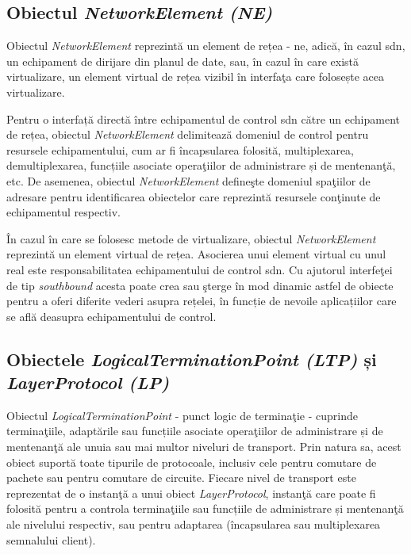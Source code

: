 \subsection{Obiectul \textit{NetworkElement (NE)}}

Obiectul \textit{NetworkElement} reprezintă un element de rețea - \gls{ne}, adică, în cazul \gls{sdn}, un echipament de dirijare din planul de date, sau, în cazul în care există virtualizare, un element virtual de rețea vizibil în interfaţa care folosește acea virtualizare.

Pentru o interfață directă între echipamentul de control \gls{sdn} către un echipament de rețea, obiectul \textit{NetworkElement} delimitează domeniul de control pentru resursele echipamentului, cum ar fi încapsularea folosită, multiplexarea, demultiplexarea, funcțiile asociate operaţiilor de administrare și de mentenanţă, etc. De asemenea, obiectul \textit{NetworkElement} defineşte domeniul spaţiilor de adresare pentru identificarea obiectelor care reprezintă resursele conţinute de echipamentul respectiv.

În cazul în care se folosesc metode de virtualizare, obiectul \textit{NetworkElement} reprezintă un element virtual de rețea. Asocierea unui element virtual cu unul real este responsabilitatea echipamentului de control \gls{sdn}. Cu ajutorul interfeţei de tip \textit{southbound} acesta poate crea sau şterge în mod dinamic astfel de obiecte pentru a oferi diferite vederi asupra rețelei, în funcție de nevoile aplicațiilor care se află deasupra echipamentului de control.

\subsection{Obiectele \textit{LogicalTerminationPoint (LTP)} și \textit{LayerProtocol (LP)}}

Obiectul \textit{LogicalTerminationPoint} - punct logic de terminaţie - cuprinde terminaţiile, adaptările sau funcțiile asociate operaţiilor de administrare și de mentenanţă ale unuia sau mai multor niveluri de transport. Prin natura sa, acest obiect suportă toate tipurile de protocoale, inclusiv cele pentru comutare de pachete sau pentru comutare de circuite. Fiecare nivel de transport este reprezentat de o instanţă a unui obiect \textit{LayerProtocol}, instanţă care poate fi folosită pentru a controla terminaţiile sau funcțiile de administrare și mentenanţă ale nivelului respectiv, sau pentru adaptarea (încapsularea sau multiplexarea semnalului client).

